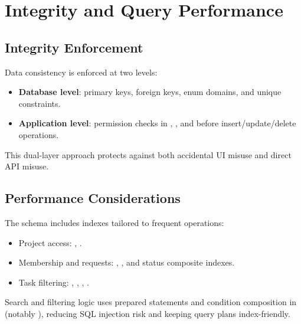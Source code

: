 \section{Integrity and Query Performance}

\subsection{Integrity Enforcement}

Data consistency is enforced at two levels:
\begin{itemize}
    \item \textbf{Database level}: primary keys, foreign keys, enum domains, and unique constraints.
    \item \textbf{Application level}: permission checks in , , and  before insert/update/delete operations.
\end{itemize}

This dual-layer approach protects against both accidental UI misuse and direct API misuse.

\subsection{Performance Considerations}

The schema includes indexes tailored to frequent operations:
\begin{itemize}
    \item Project access: , .
    \item Membership and requests: , , and status composite indexes.
    \item Task filtering: , , , .
\end{itemize}

Search and filtering logic uses prepared statements and condition composition in
 (notably ), reducing SQL injection risk and keeping query plans index-friendly.
